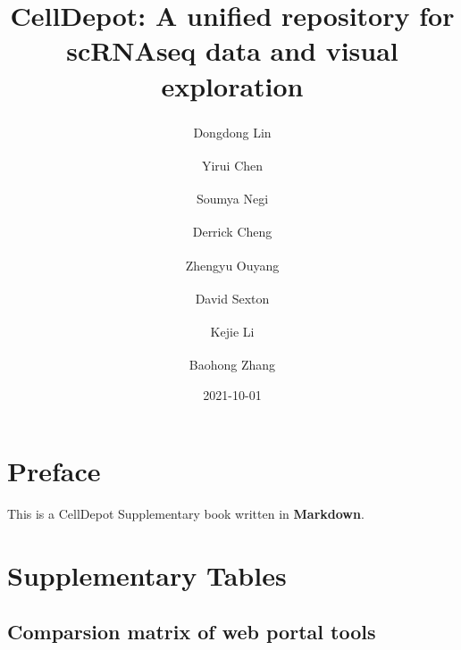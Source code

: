 \documentclass[
]{book}
\title{CellDepot: A unified repository for scRNAseq data and visual exploration}
\author{Dongdong Lin\textsuperscript{} \and Yirui Chen\textsuperscript{} \and Soumya Negi\textsuperscript{} \and Derrick Cheng\textsuperscript{} \and Zhengyu Ouyang\textsuperscript{} \and David Sexton\textsuperscript{} \and Kejie Li\textsuperscript{} \and Baohong Zhang\textsuperscript{}}
\date{2021-10-01}
\begin{document}
\maketitle

{
\setcounter{tocdepth}{1}
\tableofcontents
}
\hypertarget{preface}{%
\chapter{Preface}\label{preface}}

This is a CellDepot Supplementary book written in \textbf{Markdown}.

\hypertarget{SITable}{%
\chapter{Supplementary Tables}\label{SITable}}

\hypertarget{comparsion-matrix-of-web-portal-tools}{%
\section{Comparsion matrix of web portal tools}\label{comparsion-matrix-of-web-portal-tools}}
\end{document}
